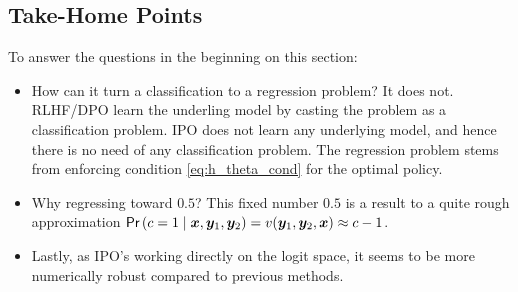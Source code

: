 \documentclass[11pt,a4paper]{article}
\begin{document}
\subsection{Take-Home Points}%
\label{sub:take_home_points}
To answer the questions in the beginning on this section:
\begin{itemize}
    \item How can it turn a classification to a regression problem? It does not. RLHF/DPO learn the underling model by casting the problem as a classification problem. IPO does not learn any underlying model, and hence there is no need of any classification problem. The regression problem stems from enforcing condition \eqref{eq:h_theta_cond} for the optimal policy.
    \item Why regressing toward $0.5$? This fixed number $0.5$ is a result to a quite rough approximation $\textsf{Pr}\left(c=1\mid \bm{x}, \bm{y}_1, \bm{y}_2\right) = v(\bm{y}_1, \bm{y}_2, \bm{x}) \approx c-1$. 
    \item Lastly, as IPO's working directly on the logit space, it seems to be more numerically robust compared to previous methods.


\end{itemize}
\end{document}
